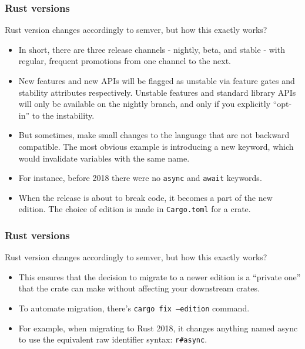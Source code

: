 \documentclass[aspectratio=1610,t]{beamer}
\begin{document}

\begin{frame}[fragile]
\frametitle{Rust versions}
Rust version changes accordingly to semver, but how this exactly works?

\begin{itemize}
    \item<1-> In short, there are three release channels - nightly, beta, and stable - with regular, frequent promotions from one channel to the next.
    \item<2-> New features and new APIs will be flagged as unstable via feature gates and stability attributes respectively. Unstable features and standard library APIs will only be available on the nightly branch, and only if you explicitly ``opt-in'' to the instability.
    \item<3-> But sometimes, make small changes to the language that are not backward compatible. The most obvious example is introducing a new keyword, which would invalidate variables with the same name.
    \item<4-> For instance, before 2018 there were no \texttt{async} and \texttt{await} keywords.
    \item<5-> When the release is about to break code, it becomes a part of the new edition. The choice of edition is made in \texttt{Cargo.toml} for a crate.
\end{itemize}
\end{frame}


\begin{frame}[fragile]
\frametitle{Rust versions}
Rust version changes accordingly to semver, but how this exactly works?

\begin{itemize}
    \item<1-> This ensures that the decision to migrate to a newer edition is a ``private one'' that the crate can make without affecting your downstream crates.
    \item<2-> To automate migration, there's \texttt{cargo fix --edition} command.
    \item<3-> For example, when migrating to Rust 2018, it changes anything named async to use the equivalent raw identifier syntax: \texttt{r\#async}.
\end{itemize}
\end{frame}
\end{document}
